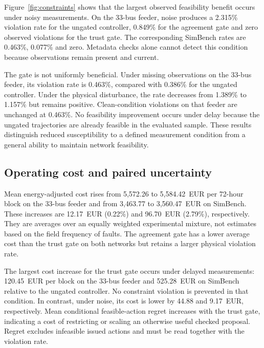 \documentclass[11pt,a4paper]{article}
\begin{document}
Figure~\ref{fig:constraints} shows that the largest observed feasibility benefit occurs under noisy measurements. On the 33-bus feeder, noise produces a 2.315\% violation rate for the ungated controller, 0.849\% for the agreement gate and zero observed violations for the trust gate. The corresponding SimBench rates are 0.463\%, 0.077\% and zero. Metadata checks alone cannot detect this condition because observations remain present and current.

The gate is not uniformly beneficial. Under missing observations on the 33-bus feeder, its violation rate is 0.463\%, compared with 0.386\% for the ungated controller. Under the physical disturbance, the rate decreases from 1.389\% to 1.157\% but remains positive. Clean-condition violations on that feeder are unchanged at 0.463\%. No feasibility improvement occurs under delay because the ungated trajectories are already feasible in the evaluated sample. These results distinguish reduced susceptibility to a defined measurement condition from a general ability to maintain network feasibility.

\subsection{Operating cost and paired uncertainty}
Mean energy-adjusted cost rises from 5,572.26 to 5,584.42~EUR per 72-hour block on the 33-bus feeder and from 3,463.77 to 3,560.47~EUR on SimBench. These increases are 12.17~EUR (0.22\%) and 96.70~EUR (2.79\%), respectively. They are averages over an equally weighted experimental mixture, not estimates based on the field frequency of faults. The agreement gate has a lower average cost than the trust gate on both networks but retains a larger physical violation rate.

The largest cost increase for the trust gate occurs under delayed measurements: 120.45~EUR per block on the 33-bus feeder and 525.28~EUR on SimBench relative to the ungated controller. No constraint violation is prevented in that condition. In contrast, under noise, its cost is lower by 44.88 and 9.17~EUR, respectively. Mean conditional feasible-action regret increases with the trust gate, indicating a cost of restricting or scaling an otherwise useful checked proposal. Regret excludes infeasible issued actions and must be read together with the violation rate.
\end{document}
